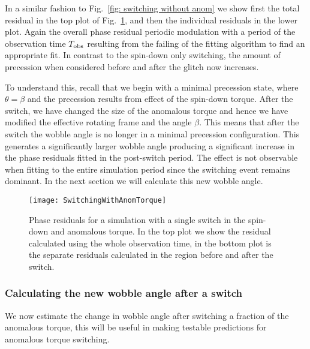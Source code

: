 \documentclass[../full_thesis/full_thesis.tex]{subfiles}
\begin{document}
In a similar fashion to Fig.~\ref{fig: switching without anom} we show first
the total residual in the top plot of Fig.~\ref{fig: switching with anom}, and
then the individual residuals in the lower plot. Again the overall phase
residual periodic modulation with a period of the observation time $T_{\textrm{obs}}$
resulting from the failing of the fitting algorithm to find an appropriate fit.
In contrast to the spin-down only switching, the amount of precession when
considered before and after the glitch now increases.

To understand this, recall that we begin with a minimal precession state, where
$\theta = \beta$ and the precession results from effect of the spin-down
torque.  After the switch, we have changed the size of the anomalous torque and
hence we have modified the effective rotating frame and the angle $\beta$. This
means that after the switch the wobble angle is no longer in a minimal
precession configuration.
This generates a significantly larger wobble angle producing a significant
increase in the phase residuals fitted in the post-switch period. The effect is
not observable when fitting to the entire simulation period since the switching
event remains dominant. In the next section we will calculate this new wobble
angle.
\begin{figure}[htb]
\texttt{[image: SwitchingWithAnomTorque]} \caption{Phase
residuals for a simulation with a single switch in the spin-down and anomalous
torque. In the top plot we show the residual calculated using the whole
observation time, in the bottom plot is the separate residuals calculated in
the region before and after the switch.}
\label{fig: switching with anom}
\end{figure}

\subsubsection{Calculating the new wobble angle after a switch}
We now estimate the change in wobble angle after switching a fraction of the
anomalous torque, this will be useful in making testable predictions for
anomalous torque switching.
\end{document}
